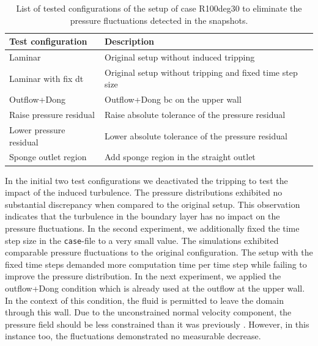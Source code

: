 \begin{table}[h!]
    \centering
    \caption{List of tested configurations of the setup of case R100deg30 to eliminate the pressure fluctuations detected in the snapshots.}
    \label{tab:presFluctTests}
    \renewcommand{\arraystretch}{1.2}
    \begin{tabular}{L{0.22\textwidth} L{0.6\textwidth}}
    \toprule
    {\textbf{Test configuration}} &{\textbf{Description}}  \\
    \midrule
    Laminar & Original setup without induced tripping \\
    \hline
    Laminar with fix dt & Original setup without tripping and fixed time step size  \\
    \hline
    Outflow+Dong & Outflow+Dong \acrshort{bc} on the upper wall  \\
    \hline
    Raise pressure residual & Raise absolute tolerance of the pressure residual \\
    \hline
    Lower pressure residual & Lower absolute tolerance of the pressure residual  \\
    \hline
    Sponge outlet region & Add sponge region in the straight outlet  \\
    \bottomrule
    \end{tabular}
\end{table}


In the initial two test configurations we deactivated the tripping to test the impact of the induced turbulence.
The pressure distributions exhibited no substantial discrepancy when compared to the original setup.
This observation indicates that the turbulence in the boundary layer has no impact on the pressure fluctuations.
In the second experiment, we additionally fixed the time step size in the \verb|case|-file to a very small value.
The simulations exhibited comparable pressure fluctuations to the original configuration.
The setup with the fixed time steps demanded more computation time per time step while failing to improve the pressure distribution.
In the next experiment, we applied the outflow+Dong condition which is already used at the outflow at the upper wall.
In the context of this condition, the fluid is permitted to leave the domain through this wall.
Due to the unconstrained normal velocity component, the pressure field should be less constrained than it was previously \citep{dong_robust_2014}.
However, in this instance too, the fluctuations demonstrated no measurable decrease.



